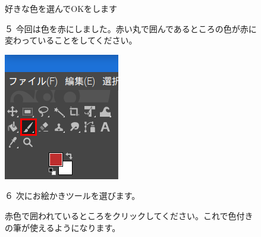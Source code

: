 \documentclass[a4paper,12pt]{jarticle}
\begin{document}
\begin{figure}[ht]
\begin{minipage}{\textwidth}
\begin{minipage}{0.45\linewidth}
      好きな色を選んでOKをします

      \bigskip
      \begin{minipage}{\linewidth}
        ５
        今回は色を赤にしました。赤い丸で囲んであるところの色が赤に変わっていることをしてください。


      \end{minipage}
    \end{minipage}
  \end{minipage}

  \includegraphics[width=0.3\linewidth]{textbook-img127.png}
  \begin{minipage}[b]{0.7\textwidth}
    ６ 次にお絵かきツールを選びます。

    赤色で囲われているところをクリックしてください。これで色付きの筆が使えるようになります。


    \bigskip
    \bigskip
    \bigskip
    \bigskip

  \end{minipage}
\end{figure}
\clearpage
\end{document}
